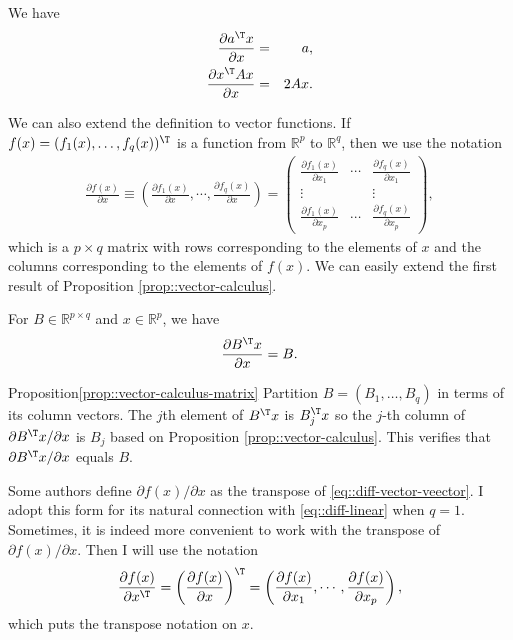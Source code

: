 \begin{proposition}\label{prop::vector-calculus}
We have
\begin{eqnarray*}
\frac{\partial a^{\T} x  }{\partial  x}  &=& a, \\
\frac{ \partial  x^{\T} A x }{ \partial  x} &=& 2 Ax . 
\end{eqnarray*}
\end{proposition}

We can also extend the definition to vector functions. If $f(x) = (f_1(x), \ldots, f_q(x))^{\T}$ is a function from $\mathbb{R}^p$ to $\mathbb{R}^q$, then we use the notation
\begin{eqnarray}
\label{eq::diff-vector-veector}
\frac{\partial f(x)}{\partial  x}  \equiv  \left( \frac{\partial f_1(x)}{\partial  x}  ,\cdots, \frac{\partial f_q(x)}{\partial  x}  \right)
=\begin{pmatrix}
 \frac{\partial f_1(x)}{\partial  x_1} & \cdots &  \frac{\partial f_q(x)}{\partial  x_1} \\
 \vdots & & \vdots \\
  \frac{\partial f_1(x)}{\partial  x_p} & \cdots &  \frac{\partial f_q(x)}{\partial  x_p} 
\end{pmatrix},
\end{eqnarray} 
which is a $p\times q$ matrix with rows corresponding to the elements of $x$ and the columns corresponding to the elements of $f(x)$. 
We can easily extend the first result of Proposition \ref{prop::vector-calculus}.

\begin{proposition}\label{prop::vector-calculus-matrix}
For $B\in \mathbb{R}^{p \times q}$ and $x\in \mathbb{R}^p$, we have 
$$
\frac{\partial B^{\T} x  }{\partial  x}  = B. 
$$
\end{proposition}

 \begin{myproof}{Proposition}{\ref{prop::vector-calculus-matrix}}
 Partition $B= (B_1, \ldots, B_q)$ in terms of its column vectors. 
The $j$th element of $B^{\T}x$ is $B_j^{\T}x$ so the $j$-th column of $ \partial B^{\T}x / \partial x$ is $B_j$ based on Proposition \ref{prop::vector-calculus}. This verifies that $ \partial B^{\T}x / \partial x$ equals $B$. 
 \end{myproof}
 
 
 
 

Some authors define $\partial f(x) / \partial  x$ as the transpose of \eqref{eq::diff-vector-veector}. I adopt this form for its natural  connection with 
\eqref{eq::diff-linear} when $q=1$. 
Sometimes, it is indeed more convenient to work with the transpose of $\partial f(x) / \partial  x$. Then I will use the notation
$$
\frac{\partial f(x)}{\partial  x^{\T}}  = \left( \frac{\partial f(x)}{\partial  x}   \right)^{\T} 
=  \left( \frac{\partial f(x)}{\partial  x_1}  ,\cdots, \frac{\partial f(x)}{\partial  x_p}  \right), 
$$
which puts the transpose notation on $x$. 


